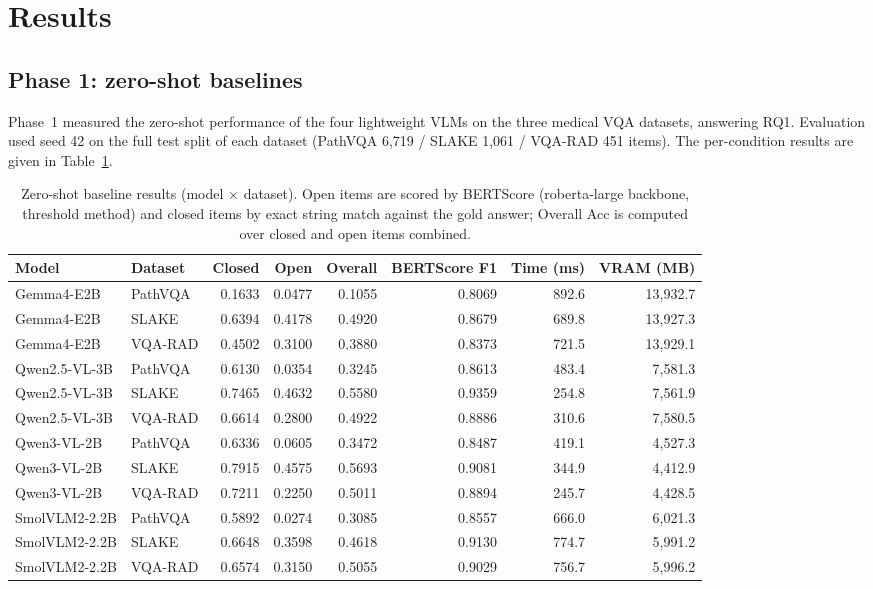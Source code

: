 \section{Results}
\label{sec:results}

\subsection{Phase 1: zero-shot baselines}
\label{sec:res-phase1}

Phase~1 measured the zero-shot performance of the four lightweight VLMs on the
three medical VQA datasets, answering RQ1. Evaluation used seed 42 on the full
test split of each dataset (PathVQA 6,719 / SLAKE 1,061 / VQA-RAD 451 items).
The per-condition results are given in Table~\ref{tab:phase1}.

\begin{table}[t]
\centering
\caption{Zero-shot baseline results (model $\times$ dataset). Open items are
scored by BERTScore (roberta-large backbone, threshold method) and closed items
by exact string match against the gold answer; Overall Acc is computed over
closed and open items combined.}
\label{tab:phase1}
\small
\begin{tabular}{@{}llrrrrrr@{}}
\toprule
Model & Dataset & Closed & Open & Overall & BERTScore F1 & Time (ms) & VRAM (MB) \\
\midrule
Gemma4-E2B    & PathVQA & 0.1633 & 0.0477 & 0.1055 & 0.8069 & 892.6 & 13,932.7 \\
Gemma4-E2B    & SLAKE   & 0.6394 & 0.4178 & 0.4920 & 0.8679 & 689.8 & 13,927.3 \\
Gemma4-E2B    & VQA-RAD & 0.4502 & 0.3100 & 0.3880 & 0.8373 & 721.5 & 13,929.1 \\
Qwen2.5-VL-3B & PathVQA & 0.6130 & 0.0354 & 0.3245 & 0.8613 & 483.4 & 7,581.3 \\
Qwen2.5-VL-3B & SLAKE   & 0.7465 & 0.4632 & 0.5580 & 0.9359 & 254.8 & 7,561.9 \\
Qwen2.5-VL-3B & VQA-RAD & 0.6614 & 0.2800 & 0.4922 & 0.8886 & 310.6 & 7,580.5 \\
Qwen3-VL-2B   & PathVQA & 0.6336 & 0.0605 & 0.3472 & 0.8487 & 419.1 & 4,527.3 \\
Qwen3-VL-2B   & SLAKE   & 0.7915 & 0.4575 & 0.5693 & 0.9081 & 344.9 & 4,412.9 \\
Qwen3-VL-2B   & VQA-RAD & 0.7211 & 0.2250 & 0.5011 & 0.8894 & 245.7 & 4,428.5 \\
SmolVLM2-2.2B & PathVQA & 0.5892 & 0.0274 & 0.3085 & 0.8557 & 666.0 & 6,021.3 \\
SmolVLM2-2.2B & SLAKE   & 0.6648 & 0.3598 & 0.4618 & 0.9130 & 774.7 & 5,991.2 \\
SmolVLM2-2.2B & VQA-RAD & 0.6574 & 0.3150 & 0.5055 & 0.9029 & 756.7 & 5,996.2 \\
\bottomrule
\end{tabular}
\end{table}

